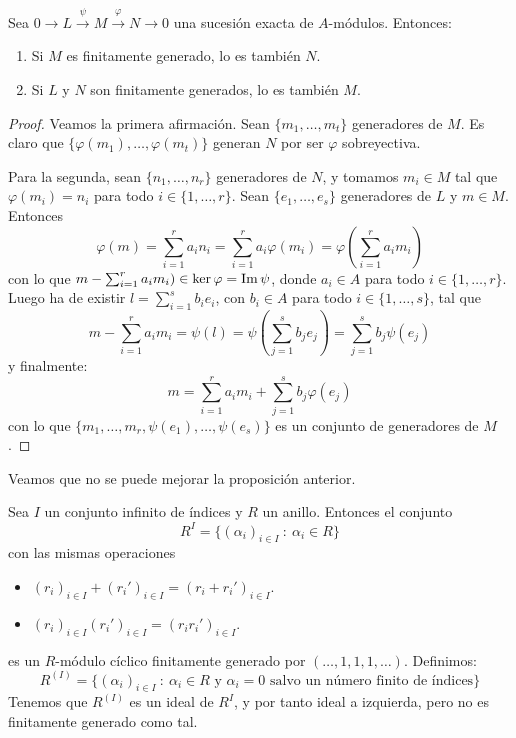 \begin{prop}
  Sea \(0\longrightarrow L\overset{\psi}{\longrightarrow} M
  \overset{\varphi}{\longrightarrow}
  N\longrightarrow 0\) una sucesión exacta de \(A\)-módulos. Entonces:
  \begin{enumerate}
  \item Si \(M\) es finitamente generado, lo es también \(N\).
  \item Si \(L\) y \(N\) son finitamente generados, lo es también \(M\).
  \end{enumerate}
\end{prop}

\begin{proof}
  Veamos la primera afirmación. Sean \(\{m_1, \ldots, m_t\}\)
  generadores de \(M\).
  Es claro que \(\{\varphi(m_1), \ldots, \varphi(m_t)\}\) generan \(N\) por ser
  \(\varphi\) sobreyectiva.

  Para la segunda, sean \(\{n_1, \ldots, n_r\}\) generadores de
  \(N\), y tomamos
  \(m_i \in M\) tal que \(\varphi(m_i)= n_i\) para todo \(i \in \{1, \ldots, r\}
  \). Sean \(\{e_1, \ldots, e_s\}\) generadores de \(L\) y \(m \in M\).
  Entonces
  \[
    \varphi(m)=\sum_{i=1}^r a_i n_i = \sum_{i=1}^r a_i\varphi(m_i)
    = \varphi\left(\sum_{i=1}^r a_i m_i\right)
  \]
  con lo que \(m- \sum_{i=1}^r a_i m_i) \in \ker \varphi = \operatorname{Im} \psi\), donde \(a_i \in A\)
  para todo \(i \in \{1, \ldots, r\}\).
  Luego ha de existir \(l = \sum_{i=1}^s b_ie_i\), con \(b_i \in A\) para todo \(i \in
  \{1, \ldots, s\}\), tal que
  \[
    m - \sum_{i=1}^r a_i m_i= \psi(l) = \psi\left(\sum_{j=1}^s b_j e_j\right) =
    \sum_{j=1}^s b_j \psi(e_j)
  \]
  y finalmente:
  \[
    m = \sum_{i=1}^r a_i m_i + \sum_{j=1}^s b_j \varphi(e_j)
  \]
  con lo que \(\{m_1, \ldots, m_r, \psi(e_1), \ldots, \psi(e_s)\}\) es un conjunto de
  generadores de \(M\).
\end{proof}


Veamos que no se puede mejorar la proposición anterior.
\begin{ejemplo}\label{ejemplo:no_noe}
  Sea \(I\) un conjunto infinito de índices y \(R\) un anillo. Entonces el conjunto
  \[
    R^I=\{{(\alpha_i)}_{i\in I} \ : \ \alpha_i\in R\}
  \]
  con las mismas operaciones
  \begin{itemize}
  \item \((r_i)_{i \in I} + (r_i')_{i \in I} = (r_i + r_i')_{i \in I}\).
  \item \((r_i)_{i \in I} (r_i')_{i \in I} = (r_i r_i')_{i \in I}\).
  \end{itemize}
  es un \(R\)-módulo cíclico finitamente generado
  por \((\ldots,1,1,1,\ldots)\). Definimos:
  \[
    R^{(I)}=\{{(\alpha_i)}_{i\in I} \ : \ \alpha_i \in R \textrm{ y } \alpha_i=0
    \textrm{ salvo un número finito de índices}\}
  \]
  Tenemos que \(R^{(I)}\) es un ideal de \(R^I\), y por tanto ideal a
  izquierda, pero no es finitamente generado como tal.
\end{ejemplo}

